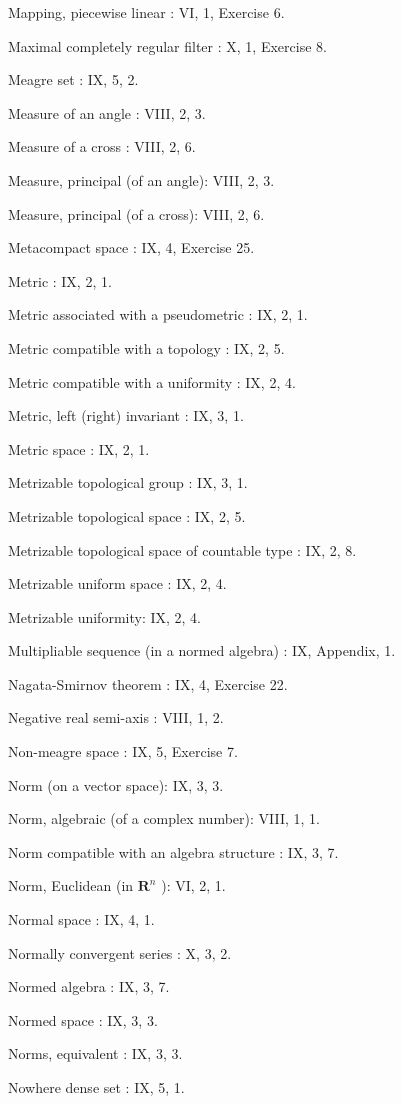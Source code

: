 Mapping, piecewise linear : VI, 1, Exercise 6.

Maximal completely regular filter : X, 1, Exercise 8.

Meagre set : IX, 5, 2.

Measure of an angle : VIII, 2, 3.

Measure of a cross : VIII, 2, 6.

Measure, principal (of an angle): VIII, 2, 3.

Measure, principal (of a cross): VIII, 2, 6.

Metacompact space : IX, 4, Exercise 25.

Metric : IX, 2, 1.

Metric associated with a pseudometric : IX, 2, 1.

Metric compatible with a topology : IX, 2, 5.

Metric compatible with a uniformity : IX, 2, 4.

Metric, left (right) invariant : IX, 3, 1.

Metric space : IX, 2, 1.

Metrizable topological group : IX, 3, 1.

Metrizable topological space : IX, 2, 5.

Metrizable topological space of countable type : IX, 2, 8.

Metrizable uniform space : IX, 2, 4.

Metrizable uniformity: IX, 2, 4.

Multipliable sequence (in a normed algebra) : IX, Appendix, 1.

Nagata-Smirnov theorem : IX, 4, Exercise 22.

Negative real semi-axis : VIII, 1, 2.

Non-meagre space : IX, 5, Exercise 7.

Norm (on a vector space): IX, 3, 3.

Norm, algebraic (of a complex number): VIII, 1, 1.

Norm compatible with an algebra structure : IX, 3, 7.

Norm, Euclidean (in \(\mathbf{R}^n\) ): VI, 2, 1.

Normal space : IX, 4, 1.

Normally convergent series : X, 3, 2.

Normed algebra : IX, 3, 7.

Normed space : IX, 3, 3.

Norms, equivalent : IX, 3, 3.

Nowhere dense set : IX, 5, 1.

